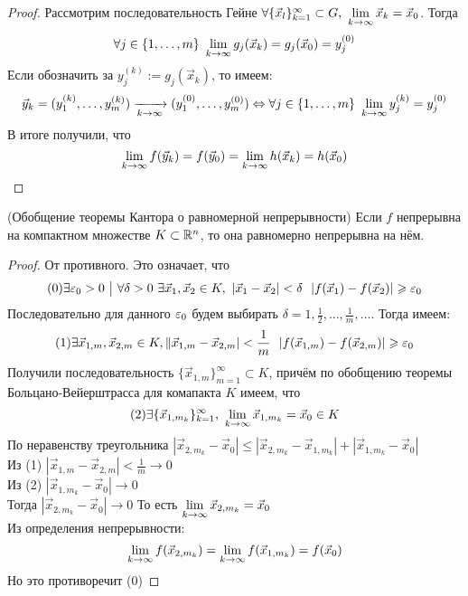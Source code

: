 \begin{proof}
	Рассмотрим последовательность Гейне $\forall \{\vec{x}_l\}_{k = 1}^\infty \subset G,\ \liml_{k \to \infty} \vec{x}_k = \vec{x}_0$. Тогда
	\[
		\forall j \in \{1, \ldots, m\}\ \lim\limits_{k \to \infty} g_j(\vec{x}_k) = g_j(\vec{x}_0) = y_j^{(0)}
	\]
	Если обозначить за $y_j^{(k)} := g_j(\vec{x}_k)$, то имеем:
	\[
		\vec{y}_k = (y_1^{(k)}, \ldots, y_m^{(k)}) \xrightarrow[k \to \infty]{} (y_1^{(0)}, \ldots, y_m^{(0)}) \Leftrightarrow \forall j \in \{1, \ldots, m\}\ \lim\limits_{k \to \infty} y_j^{(k)} = y_j^{(0)}
	\]
	В итоге получили, что
	\[
		\lim\limits_{k \to \infty} f(\vec{y}_k) = f(\vec{y}_0) = \lim\limits_{k \to \infty} h(\vec{x}_k) = h(\vec{x}_0)
	\]
\end{proof}

\begin{theorem} (Обобщение теоремы Кантора о равномерной непрерывности)
	Если $f$ непрерывна на компактном множестве $K \subset \mathbb{R}^n$, то она равномерно непрерывна на нём.
\end{theorem}

\begin{proof}
	От противного. Это означает, что
	\[(0)
		\exists \eps_0 > 0 \such \forall \delta > 0\ \exists \vec{x}_1, \vec{x}_2 \in K,\ |\vec{x}_1 - \vec{x}_2| < \delta\ \ |f(\vec{x}_1) - f(\vec{x}_2)| \ge \eps_0
	\]
	Последовательно для данного $\varepsilon_0$ будем выбирать $\delta = 1, \frac{1}{2}, \ldots, \frac{1}{m}, \ldots$. Тогда имеем:
	\[(1)
		\exists \vec{x}_{1, m}, \vec{x}_{2, m} \in K, \|\vec{x}_{1, m} - \vec{x}_{2, m}| < \frac{1}{m}\ \ |f(\vec{x}_{1, m}) - f(\vec{x}_{2, m})| \geqslant \varepsilon_0
	\]
	Получили последовательность $\{\vec{x}_{1, m}\}_{m = 1}^\infty \subset K$, причём по обобщению теоремы Больцано-Вейерштрасса для комапакта $K$ имеем, что
	\[(2)
		\exists \{\vec{x}_{1, m_k}\}_{k = 1}^\infty,\ \lim\limits_{k \to \infty} \vec{x}_{1, m_k} = \vec{x}_0 \in K
	\]
	По неравенству треугольника
	 $|\vec{x}_{2, m_k} - \vec{x}_0| \leq |\vec{x}_{2, m_k} - \vec{x}_{1, m_k}| + |\vec{x}_{1, m_k} - \vec{x}_0|$ \\
	Из (1) $|\vec{x}_{1, m} - \vec{x}_{2, m}| < \frac{1}{m} \to 0$ \\
	Из (2) $|\vec{x}_{1, m_k} - \vec{x}_0| \to 0$ \\
	Тогда  $|\vec{x}_{2, m_k} - \vec{x}_0| \to 0$  То есть $\lim\limits_{k \to \infty} \vec{x}_{2, m_k} = \vec{x}_0$ \\
	Из определения непрерывности:
	\[
		\lim\limits_{k \to \infty} f(\vec{x}_{2, m_k}) = \lim\limits_{k \to \infty} f(\vec{x}_{1, m_k}) = f(\vec{x}_0)
	\]
	Но это противоречит (0)
\end{proof}

